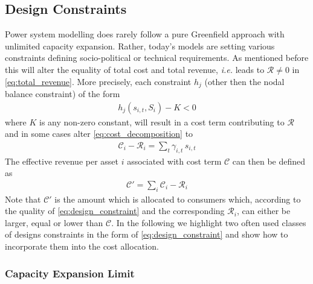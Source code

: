 \documentclass[11pt,twocolumn]{article}
\newcommand{\ie}{\textit{i.e.} }
\newcommand{\state}{s_{i,t}}
\newcommand{\capacity}{S_{i}}
\newcommand{\costfactor}{\gamma_{i,t}}
\newcommand{\cost}{\mathcal{C}}
\newcommand{\remainingcost}{\mathcal{R}}
\begin{document}
\subsection{Design Constraints}
\label{sec:design_constraints}
Power system modelling does rarely follow a pure Greenfield approach with unlimited capacity expansion. Rather, today's models are setting various constraints defining socio-political or  technical requirements. As mentioned before this will alter the equality of total cost and total revenue, \ie leads to $\remainingcost \ne 0$ in \cref{eq:total_revenue}. More precisely, each constraint $h_j$ (other then the nodal balance constraint) of the form 
\begin{align}
    h_j \left(\state, \capacity \right) - K < 0
    \label{eq:design_constraint}
\end{align}
where $K$ is any non-zero constant, will result in a cost term contributing to $\remainingcost$ and in some cases alter \cref{eq:cost_decomposition} to 
\begin{align}
    \cost_i - \remainingcost_i = \sum_t \costfactor \, \state
\end{align}
The effective revenue per asset $i$ associated with cost term $\cost$ can then be defined as 
\begin{align}
    \cost' = \sum_i  \cost_i - \remainingcost_i
    \label{altered_cost}
\end{align}
Note that $\cost'$ is the amount which is allocated to consumers which, according to the quality of \cref{eq:design_constraint} and the corresponding $\remainingcost_i$, can either be larger, equal or lower than $\cost$.  
In the following we highlight two often used classes of designs constraints in the form of \cref{eq:design_constraint} and show how to incorporate them into the cost allocation.  

\subsubsection{Capacity Expansion Limit}
\end{document}
